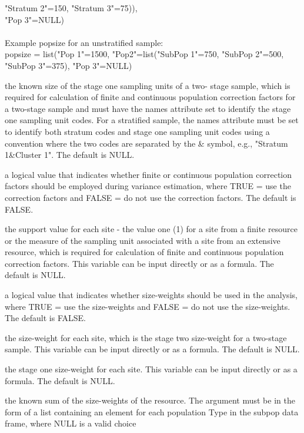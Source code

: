 \begin{Arguments}
\begin{ldescription}
"Stratum 2"=150, "Stratum 3"=75)),\\ "Pop 3"=NULL)\\\\
Example popsize for an unstratified sample:\\
popsize = list("Pop 1"=1500, "Pop2"=list("SubPop 1"=750,
"SubPop 2"=500, "SubPop 3"=375), "Pop 3"=NULL)\\
\item[\code{stage1size}] the known size of the stage one sampling units of a two-
stage sample, which is required for calculation of finite and  
continuous population correction factors for a two-stage sample and 
must have the names attribute set to identify the stage one sampling 
unit codes.  For a stratified sample, the names attribute must be set
to identify both stratum codes and stage one sampling unit codes using
a convention where the two codes are separated by the \& symbol, e.g.,
"Stratum 1\&Cluster 1".  The default is NULL.
\item[\code{popcorrect}] a logical value that indicates whether finite or continuous 
population correction factors should be employed during variance 
estimation, where TRUE = use the correction factors and FALSE = do not 
use the correction factors.  The default is FALSE.
\item[\code{support}] the support value for each site - the value one (1) for a 
site from a finite resource or the measure of the sampling unit  
associated with a site from an extensive resource, which is required  
for calculation of finite and continuous population correction  
factors.  This variable can be input directly or as a formula.  The default
is NULL.
\item[\code{sizeweight}] a logical value that indicates whether size-weights should 
be used in the analysis, where TRUE = use the size-weights and FALSE = 
do not use the size-weights.  The default is FALSE.
\item[\code{swgt}] the size-weight for each site, which is the stage two size-weight 
for a two-stage sample.  This variable can be input directly or as a 
formula.  The default is NULL.
\item[\code{swgt1}] the stage one size-weight for each site.  This variable can be 
input directly or as a formula.  The default is NULL.
\item[\code{unitsize}] the known sum of the size-weights of the resource.  The 
argument must be in the form of a list containing an element for each  
population Type in the subpop data frame, where NULL is a valid choice  

\end{ldescription}
\end{Arguments}
